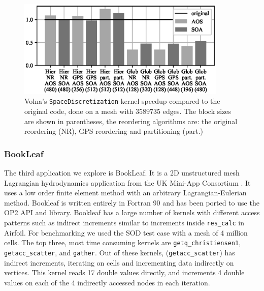\begin{figure}[Htbp]
\centering
\includegraphics[width=10cm]{fig/volna_speedup.eps}
\caption{Volna's \texttt{SpaceDiscretization} kernel speedup compared to the 
original code, done on a mesh with $3589735$ edges. The block sizes are shown 
in parentheses, the reordering algorithms are: the original reordering (NR), 
GPS reordering and partitioning (part.)}
\label{fig:volna_speedup}
\end{figure}



\subsubsection{BookLeaf}
\noindent The third application we explore is BookLeaf. It is a 2D unstructured 
mesh Lagrangian hydrodynamics application from the UK Mini-App Consortium 
\cite{uk-mac}. It uses a low order finite element method with an arbitrary 
Lagrangian-Eulerian method.  Bookleaf is written entirely in Fortran 90 and has 
been ported to use the OP2 API and library. Bookleaf has a large number of 
kernels with different access patterns such as indirect increments similar to 
increments inside \texttt{res\_calc} in Airfoil. For benchmarking we used the 
SOD test case with a mesh of 4 million cells. The top three, most 
time consuming kernels are \texttt{getq\_christiensen1}, 
\texttt{getacc\_scatter}, and \texttt{gather}. Out of these kernels, 
(\texttt{getacc\_scatter}) has indirect increments, iterating on cells and 
incrementing data indirectly on vertices. This kernel reads 17 double values 
directly, and increments 4 double values on each of the 4 indirectly accessed 
nodes in each iteration.

